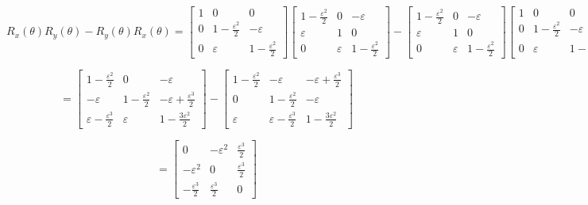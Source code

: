 \documentclass[lang=cn,10pt]{elegantbook}
\begin{document}
\[
R_x(\theta) R_y(\theta) - R_y(\theta) R_x(\theta) = 
\begin{bmatrix}
	1 & 0 & 0 \\
	0 & 1 - \frac{\varepsilon^2}{2} & -\varepsilon \\
	0 & \varepsilon & 1 - \frac{\varepsilon^2}{2}
\end{bmatrix}
\begin{bmatrix}
	1 - \frac{\varepsilon^2}{2} & 0 & -\varepsilon \\
	\varepsilon & 1 & 0 \\
	0 & \varepsilon & 1 - \frac{\varepsilon^2}{2}
\end{bmatrix}
-
\begin{bmatrix}
	1 - \frac{\varepsilon^2}{2} & 0 & -\varepsilon \\
	\varepsilon & 1 & 0 \\
	0 & \varepsilon & 1 - \frac{\varepsilon^2}{2}
\end{bmatrix}
\begin{bmatrix}
	1 & 0 & 0 \\
	0 & 1 - \frac{\varepsilon^2}{2} & -\varepsilon \\
	0 & \varepsilon & 1 - \frac{\varepsilon^2}{2}
\end{bmatrix}
\]

\[
= \begin{bmatrix}
	1 - \frac{\varepsilon^2}{2} & 0 & -\varepsilon \\
	-\varepsilon & 1 - \frac{\varepsilon^2}{2} & -\varepsilon + \frac{\varepsilon^3}{2} \\
	\varepsilon - \frac{\varepsilon^3}{2} & \varepsilon & 1 - \frac{3\varepsilon^2}{2}
\end{bmatrix}
-
\begin{bmatrix}
	1 - \frac{\varepsilon^2}{2} & -\varepsilon & -\varepsilon + \frac{\varepsilon^3}{2} \\
	0 & 1 - \frac{\varepsilon^2}{2} & -\varepsilon \\
	\varepsilon & \varepsilon - \frac{\varepsilon^3}{2} & 1 - \frac{3\varepsilon^2}{2}
\end{bmatrix}
\]

\[
= \begin{bmatrix}
	0 & -\varepsilon^2 & \frac{\varepsilon^3}{2} \\
	-\varepsilon^2 & 0 & \frac{\varepsilon^3}{2} \\
	-\frac{\varepsilon^3}{2} & \frac{\varepsilon^3}{2} & 0
\end{bmatrix}
\]
\end{document}
